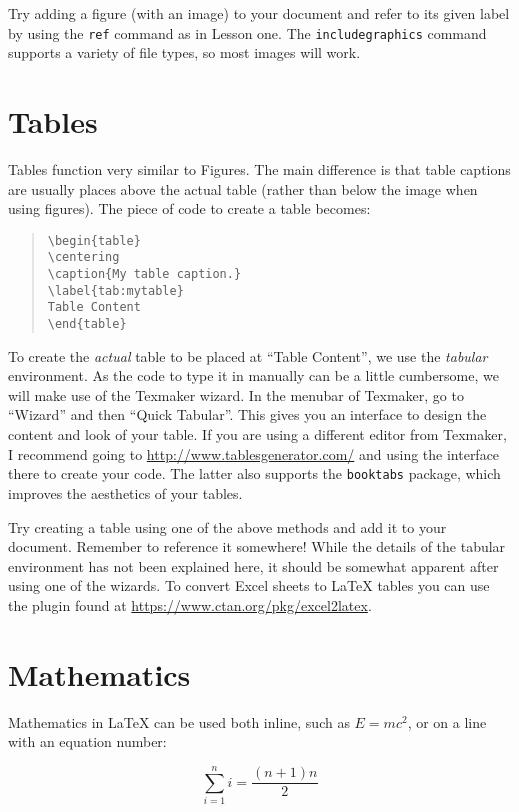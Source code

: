 \documentclass[a4paper,oneside]{memoir}
\begin{document}
Try adding a figure (with an image) to your document and refer to its given label by using the \texttt{ref} command as in Lesson one. The \texttt{includegraphics} command supports a variety of file types, so most images will work.

\section{Tables}
Tables function very similar to Figures. The main difference is that table captions are usually places above the actual table (rather than below the image when using figures). The piece of code to create a table becomes:

\begin{quote}
\begin{lstlisting}
\begin{table}
\centering
\caption{My table caption.}
\label{tab:mytable}
Table Content
\end{table}
\end{lstlisting}
\end{quote}

To create the \emph{actual} table to be placed at \enquote{Table Content}, we use the \emph{tabular} environment. As the code to type it in manually can be a little cumbersome, we will make use of the Texmaker wizard. In the menubar of Texmaker, go to \enquote{Wizard} and then \enquote{Quick Tabular}. This gives you an interface to design the content and look of your table. If you are using a different editor from Texmaker, I recommend going to \url{http://www.tablesgenerator.com/} and using the interface there to create your code. The latter also supports the \texttt{booktabs} package, which improves the aesthetics of your tables.

Try creating a table using one of the above methods and add it to your document. Remember to reference it somewhere! While the details of the tabular environment has not been explained here, it should be somewhat apparent after using one of the wizards. To convert Excel sheets to \LaTeX{} tables you can use the plugin found at \url{https://www.ctan.org/pkg/excel2latex}.

\section{Mathematics}
Mathematics in \LaTeX{} can be used both inline, such as $E = mc^2$, or on a line with an equation number:

\begin{equation}
\sum_{i=1}^{n} i = \frac{(n+1)n}{2}
\end{equation}
\end{document}
